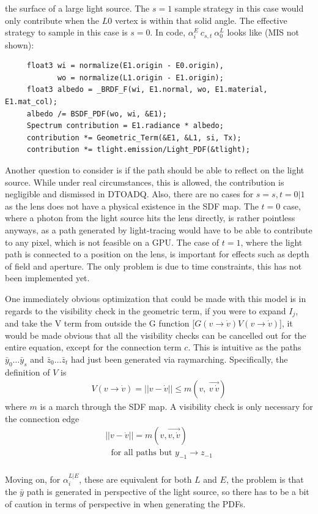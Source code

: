 \documentclass{article}
\begin{document}
    the surface of a large light source. The $s=1$ sample strategy in this case
    would only contribute when the $L0$ vertex is within that solid angle.
    The effective strategy to sample in this case is $s = 0$.
    In code, $\alpha_i^E\:c_{s,t}\:\alpha_0^L$ looks like (MIS not shown):
    \begin{lstlisting}
     float3 wi = normalize(E1.origin - E0.origin),
            wo = normalize(L1.origin - E1.origin);
     float3 albedo = _BRDF_F(wi, E1.normal, wo, E1.material, E1.mat_col);
     albedo /= BSDF_PDF(wo, wi, &E1);
     Spectrum contribution = E1.radiance * albedo;
     contribution *= Geometric_Term(&E1, &L1, si, Tx);
     contribution *= tlight.emission/Light_PDF(&tlight);
    \end{lstlisting}
    
    Another question to consider is if the path should be able to reflect on the
    light source. While under real circumstances, this is allowed, the
    contribution is negligible and dismissed in DTOADQ. Also, there are no cases for $s = s, t = 0|1$ as
    the lens does not have a physical existence in the SDF map. The $t = 0$ case, where a photon from the light source hits the lens directly, is rather pointless anyways, as a path generated by light-tracing would have to be able to contribute to any pixel, which is not feasible on a GPU. The case of $t = 1$, where the light path is connected to a position on the lens, is important for effects such as depth of field and aperture. The only problem is due to time constraints, this has not been implemented yet.

    One immediately obvious optimization that could be made with this model is
    in regards to the visibility check in the geometric term, if you were to
    expand $I_j$, and take the V term from outside the G function
    [$G(v \rightarrow
    \dot{v}) V(v \rightarrow \dot{v})$],
    it would be made obvious that all the visibility checks can be
    cancelled out for the entire equation, except for the connection term $c$.
    This is intuitive as the paths
    $\bar{y}_{0} \ldots \bar{y}_s$ and $\bar{z}_0 \ldots \bar{z}_t$ had just been generated via raymarching.
    Specifically, the definition of $V$ is
  \begin{align}
    V(v \rightarrow \dot{v}) = ||v - \dot{v}|| \leq
    m(v,\:\overrightarrow{v\:\dot{v}})
  \end{align}
    where $m$ is a march through the SDF map. A visibility check is only
    necessary for the connection edge
    \begin{align*}
      ||v - \dot{v}|| = m(v, \overrightarrow{v, \dot{v}})\\
      \:\:\:\text{for all paths but } y_{-1} \rightarrow z_{-1} 
    \end{align*}
\\
    Moving on, for $\alpha^{L|E}_i$, these are equivalent for both $L$ and $E$,
    the problem is that the $\bar{y}$ path is generated in perspective of the
    light source, so there has to be a bit of caution in terms of perspective in when generating the PDFs.
    
\end{document}
